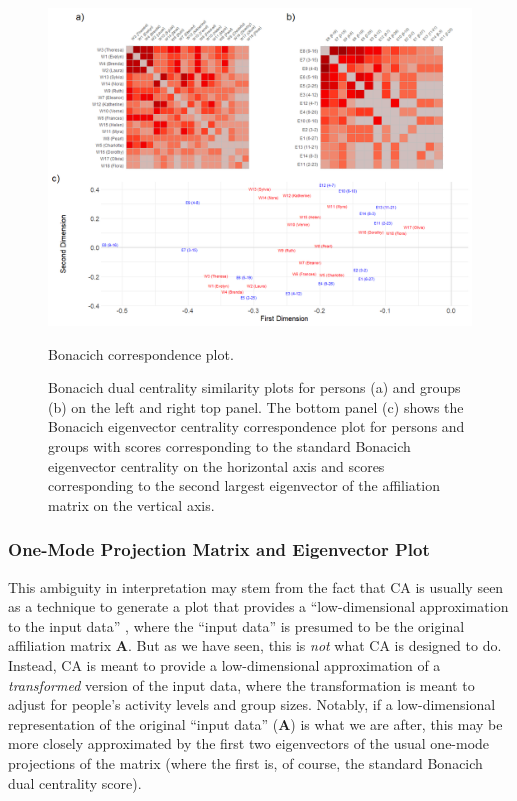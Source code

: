 \documentclass[a4paper,fleqn]{cas-sc}
\begin{document}
\begin{figure}
    \captionsetup[subfigure]{font=footnotesize,labelfont=footnotesize}
    \centering
        \includegraphics[width=1.0\textwidth]{Plots/bon-corr-plot.png}
            \caption{Bonacich correspondence plot.}
            \label{fig:bon-corr}
    \caption{Bonacich dual centrality similarity plots for persons (a) and groups (b) on the left and right top panel. The bottom panel (c) shows the Bonacich eigenvector centrality correspondence plot for persons and groups with scores corresponding to the standard Bonacich eigenvector centrality on the horizontal axis and scores corresponding to the second largest eigenvector of the affiliation matrix on the vertical axis.}
    \label{fig:bon-sim}
\end{figure}

\subsubsection{One-Mode Projection Matrix and Eigenvector Plot} \label{sec:eigplot}
This ambiguity in interpretation may stem from the fact that CA is usually seen as a technique to generate a plot that provides a ``low-dimensional approximation to the input data'' \citep[125]{faust2005using}, where the ``input data'' is presumed to be the original affiliation matrix $\mathbf{A}$. But as we have seen, this is \textit{not} what CA is designed to do. Instead, CA is meant to provide a low-dimensional approximation of a \textit{transformed} version of the input data, where the transformation is meant to adjust for people's activity levels and group sizes. Notably, if a low-dimensional representation of the original ``input data'' ($\mathbf{A}$) is what we are after, this may be more closely approximated by the first two eigenvectors of the usual one-mode projections of the matrix (where the first is, of course, the standard Bonacich dual centrality score). 
\end{document}
